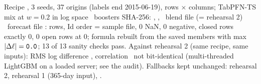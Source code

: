Recipe , 3 seeds, 37 origins (labels end 2015-06-19),  rows $\times$  columns; TabPFN-TS mix at
$w=0.2$ in log space \textbullet\ boosters SHA-256: , , 
\textbullet\ blend file  (= rehearsal 2) \textbullet\ forecast file :  rows,
Id order = sample file, 0 NaN, 0 negative,  closed rows exactly 0, 0 open rows at 0; formula rebuilt from the saved
members with max $|\Delta\ell|=\texttt{0.0}$; 13 of 13 sanity checks pass. Against rehearsal 2 (same recipe, same inputs): RMS log
difference , correlation  \textendash\ not bit-identical (multi-threaded LightGBM on a loaded server; see the
audit). Fallbacks kept unchanged: rehearsal 2, rehearsal 1 (365-day input), .
